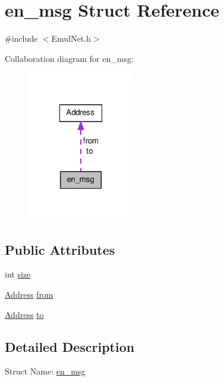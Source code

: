 \hypertarget{structen__msg}{\section{en\-\_\-msg \-Struct \-Reference}
\label{db/db3/structen__msg}
}


{\ttfamily \#include $<$\-Emul\-Net.\-h$>$}



\-Collaboration diagram for en\-\_\-msg\-:
\nopagebreak
\begin{figure}[H]
\begin{center}
\leavevmode
\includegraphics[width=132pt]{d3/d7d/structen__msg__coll__graph}
\end{center}
\end{figure}
\subsection*{\-Public \-Attributes}
\begin{DoxyCompactItemize}
\item 
int \hyperlink{structen__msg_a27abf25d730baec522335832f45aa326}{size}
\item 
\hyperlink{class_address}{\-Address} \hyperlink{structen__msg_adbad5e8a9e8b7711d36d0c5d24f1c450}{from}
\item 
\hyperlink{class_address}{\-Address} \hyperlink{structen__msg_a20e7e03059b603a54a98841ffcc56501}{to}
\end{DoxyCompactItemize}


\subsection{\-Detailed \-Description}
\-Struct \-Name\-: \hyperlink{structen__msg}{en\-\_\-msg} 

